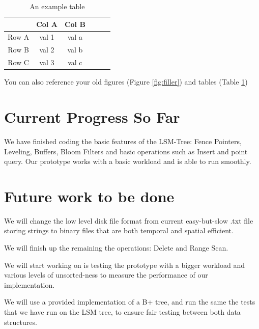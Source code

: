 \documentclass[sigconf]{acmart}
\begin{document}
    \begin{table}[H]
        \caption{An example table}
        \label{tab:ex}
        \centering

        \begin{tabular}{c |c c c c c}
            \hline\hline
            & Col A & Col B \\
            \hline
            Row A & val 1 & val a \\
            Row B & val 2 & val b \\
            Row C & val 3 & val c \\
            \hline
        \end{tabular}
    \end{table}

    You can also reference your old figures (Figure \ref{fig:filler}) and tables
    (Table \ref{tab:ex})

    \section{Current Progress So Far}

    We have finished coding the basic features of the LSM-Tree: Fence Pointers, Leveling, Buffers, Bloom Filters and basic operations such as Insert and point query. Our prototype works with a basic workload and is able to run smoothly.

    \section{Future work to be done}

    We will change the low level disk file format from current easy-but-slow .txt file storing strings to binary files that are both temporal and spatial efficient.

    We will finish up the remaining the operations: Delete and Range Scan.

    We will start working on is testing the prototype with a bigger workload and various levels of unsorted-ness to measure the performance of our implementation.


    We will use a provided implementation of a B+ tree, and run the same the tests that we have run on the LSM tree, to ensure fair testing between both data structures.
\end{document}
